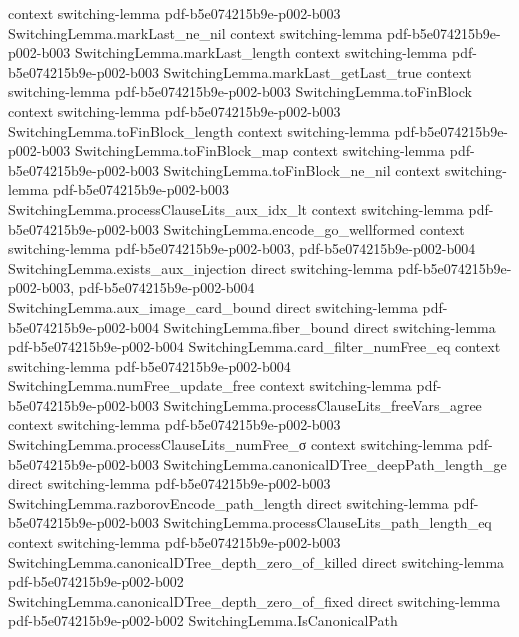 \begin{theorem}
  {context}
  {switching-lemma}
  {pdf-b5e074215b9e-p002-b003}
\proofstep
  {SwitchingLemma.markLast_ne_nil}
  {context}
  {switching-lemma}
  {pdf-b5e074215b9e-p002-b003}
\proofstep
  {SwitchingLemma.markLast_length}
  {context}
  {switching-lemma}
  {pdf-b5e074215b9e-p002-b003}
\proofstep
  {SwitchingLemma.markLast_getLast_true}
  {context}
  {switching-lemma}
  {pdf-b5e074215b9e-p002-b003}
\proofstep
  {SwitchingLemma.toFinBlock}
  {context}
  {switching-lemma}
  {pdf-b5e074215b9e-p002-b003}
\proofstep
  {SwitchingLemma.toFinBlock_length}
  {context}
  {switching-lemma}
  {pdf-b5e074215b9e-p002-b003}
\proofstep
  {SwitchingLemma.toFinBlock_map}
  {context}
  {switching-lemma}
  {pdf-b5e074215b9e-p002-b003}
\proofstep
  {SwitchingLemma.toFinBlock_ne_nil}
  {context}
  {switching-lemma}
  {pdf-b5e074215b9e-p002-b003}
\proofstep
  {SwitchingLemma.processClauseLits_aux_idx_lt}
  {context}
  {switching-lemma}
  {pdf-b5e074215b9e-p002-b003}
\proofstep
  {SwitchingLemma.encode_go_wellformed}
  {context}
  {switching-lemma}
  {pdf-b5e074215b9e-p002-b003,
    pdf-b5e074215b9e-p002-b004}
\proofstep
  {SwitchingLemma.exists_aux_injection}
  {direct}
  {switching-lemma}
  {pdf-b5e074215b9e-p002-b003,
    pdf-b5e074215b9e-p002-b004}
\proofstep
  {SwitchingLemma.aux_image_card_bound}
  {direct}
  {switching-lemma}
  {pdf-b5e074215b9e-p002-b004}
\proofstep
  {SwitchingLemma.fiber_bound}
  {direct}
  {switching-lemma}
  {pdf-b5e074215b9e-p002-b004}
\proofstep
  {SwitchingLemma.card_filter_numFree_eq}
  {context}
  {switching-lemma}
  {pdf-b5e074215b9e-p002-b004}
\proofstep
  {SwitchingLemma.numFree_update_free}
  {context}
  {switching-lemma}
  {pdf-b5e074215b9e-p002-b003}
\proofstep
  {SwitchingLemma.processClauseLits_freeVars_agree}
  {context}
  {switching-lemma}
  {pdf-b5e074215b9e-p002-b003}
\proofstep
  {SwitchingLemma.processClauseLits_numFree_σ}
  {context}
  {switching-lemma}
  {pdf-b5e074215b9e-p002-b003}
\proofstep
  {SwitchingLemma.canonicalDTree_deepPath_length_ge}
  {direct}
  {switching-lemma}
  {pdf-b5e074215b9e-p002-b003}
\proofstep
  {SwitchingLemma.razborovEncode_path_length}
  {direct}
  {switching-lemma}
  {pdf-b5e074215b9e-p002-b003}
\proofstep
  {SwitchingLemma.processClauseLits_path_length_eq}
  {context}
  {switching-lemma}
  {pdf-b5e074215b9e-p002-b003}
\proofstep
  {SwitchingLemma.canonicalDTree_depth_zero_of_killed}
  {direct}
  {switching-lemma}
  {pdf-b5e074215b9e-p002-b002}
\proofstep
  {SwitchingLemma.canonicalDTree_depth_zero_of_fixed}
  {direct}
  {switching-lemma}
  {pdf-b5e074215b9e-p002-b002}
\proofstep
  {SwitchingLemma.IsCanonicalPath}

\end{theorem}
